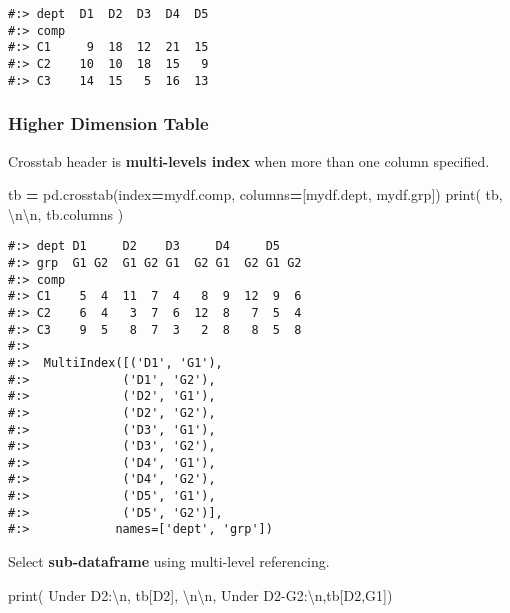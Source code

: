 \documentclass[
]{book}
\newenvironment{Shaded}{\begin{snugshade}}{\end{snugshade}}
\newcommand{\BuiltInTok}[1]{#1}
\newcommand{\CharTok}[1]{\textcolor[rgb]{0.5,0.5,0.5}{#1}}
\newcommand{\NormalTok}[1]{#1}
\newcommand{\OperatorTok}[1]{\textcolor[rgb]{0.43,0.43,0.43}{\textbf{#1}}}
\newcommand{\StringTok}[1]{\textcolor[rgb]{0.5,0.5,0.5}{#1}}
\begin{document}
\begin{verbatim}
#:> dept  D1  D2  D3  D4  D5
#:> comp                    
#:> C1     9  18  12  21  15
#:> C2    10  10  18  15   9
#:> C3    14  15   5  16  13
\end{verbatim}

\hypertarget{higher-dimension-table}{%
\subsubsection{Higher Dimension Table}\label{higher-dimension-table}}

Crosstab header is \textbf{multi-levels index} when more than one column specified.

\begin{Shaded}
\begin{Highlighting}[]
\NormalTok{tb }\OperatorTok{=}\NormalTok{ pd.crosstab(index}\OperatorTok{=}\NormalTok{mydf.comp, columns}\OperatorTok{=}\NormalTok{[mydf.dept, mydf.grp])}
\BuiltInTok{print}\NormalTok{( tb, }\StringTok{\textquotesingle{}}\CharTok{\textbackslash{}n\textbackslash{}n}\StringTok{\textquotesingle{}}\NormalTok{,}
\NormalTok{       tb.columns )}
\end{Highlighting}
\end{Shaded}

\begin{verbatim}
#:> dept D1     D2    D3     D4     D5   
#:> grp  G1 G2  G1 G2 G1  G2 G1  G2 G1 G2
#:> comp                                 
#:> C1    5  4  11  7  4   8  9  12  9  6
#:> C2    6  4   3  7  6  12  8   7  5  4
#:> C3    9  5   8  7  3   2  8   8  5  8 
#:> 
#:>  MultiIndex([('D1', 'G1'),
#:>             ('D1', 'G2'),
#:>             ('D2', 'G1'),
#:>             ('D2', 'G2'),
#:>             ('D3', 'G1'),
#:>             ('D3', 'G2'),
#:>             ('D4', 'G1'),
#:>             ('D4', 'G2'),
#:>             ('D5', 'G1'),
#:>             ('D5', 'G2')],
#:>            names=['dept', 'grp'])
\end{verbatim}

Select \textbf{sub-dataframe} using multi-level referencing.

\begin{Shaded}
\begin{Highlighting}[]
\BuiltInTok{print}\NormalTok{( }\StringTok{\textquotesingle{}Under D2:}\CharTok{\textbackslash{}n}\StringTok{\textquotesingle{}}\NormalTok{, tb[}\StringTok{\textquotesingle{}D2\textquotesingle{}}\NormalTok{], }\StringTok{\textquotesingle{}}\CharTok{\textbackslash{}n\textbackslash{}n}\StringTok{\textquotesingle{}}\NormalTok{,}
       \StringTok{\textquotesingle{}Under D2{-}G2:}\CharTok{\textbackslash{}n}\StringTok{\textquotesingle{}}\NormalTok{,tb[}\StringTok{\textquotesingle{}D2\textquotesingle{}}\NormalTok{,}\StringTok{\textquotesingle{}G1\textquotesingle{}}\NormalTok{])}
\end{Highlighting}
\end{Shaded}
\end{document}
